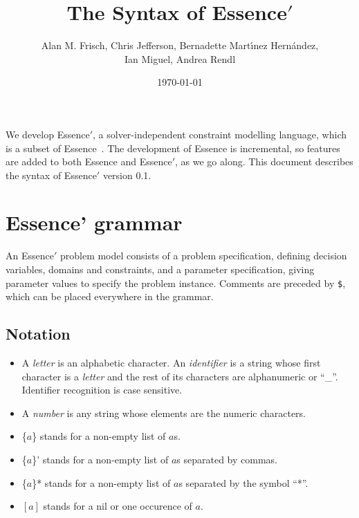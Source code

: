 \documentclass{article}
\begin{document}
\title{The Syntax of {\sc Essence}$'$} %

\author{Alan M. Frisch, Chris Jefferson, Bernadette  Mart\'{\i}nez Hern{\'a}ndez,\\ Ian Miguel, Andrea Rendl} %


\date{\today}

\maketitle


We develop {\sc Essence}$'$, a solver-independent constraint modelling language,
which is a subset of {\sc Essence}~\cite{essence}. The development of {\sc Essence} is incremental, 
so features are added to both {\sc Essence} and {\sc Essence}$'$, as we go along. This document describes the syntax of 
{\sc Essence}$'$ version 0.1. 


\section{{\sc Essence'} grammar}

An {\sc Essence}$'$ problem model 
consists of a problem specification, defining decision variables, domains and constraints, 
and a parameter specification, giving parameter values to specify the problem instance. 
Comments are preceded by {\tt \$}, which can be placed everywhere in the grammar. 

\subsection{Notation}

\begin{itemize}

  \item A \textit{letter} is an alphabetic character. An \textit{identifier} is 
    a string whose first character is a \textit{letter} and the rest of its characters 
    are alphanumeric or ``\_''.  Identifier recognition is case sensitive. 

  \item A \textit{number} is any string whose elements are the numeric characters.
  \item \{$a$\} stands for a non-empty list of $a$s.
  \item \{$a$\}' stands for a non-empty list of $a$s separated by commas.
  \item \{$a$\}* stands for a non-empty list of $a$s separated by the symbol ``*''.
  \item $[a]$ stands for a nil or one occurence of $a$.

\end{itemize}
\end{document}
